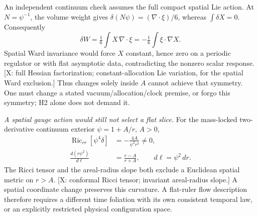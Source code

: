 An independent continuum check assumes the full compact spatial Lie
action.  At $N=\psi^{-1}$, the volume weight gives
$\delta(N\psi)=(\nabla\cdot\xi)/6$, whereas $\int\delta X=0$.
Consequently
\[
 \delta W=\tfrac16\int X\,\nabla\cdot\xi
          =-\tfrac16\int\xi\cdot\nabla X .
\]
Spatial Ward invariance would force $X$ constant, hence zero on a
periodic regulator or with flat asymptotic data, contradicting the
nonzero scalar response.
[X: full Hessian factorization; constant-allocation Lie variation,
for the spatial Ward exclusion.]
Thus changes solely inside $A$ cannot achieve that symmetry.
One must change a stated vacuum/allocation/clock premise, or forgo
this symmetry; H2 alone does not demand it.

\emph{A spatial gauge action would still not select a flat slice.}
For the mass-locked two-derivative continuum exterior
$\psi=1+A/r$, $A>0$,
\[
 \begin{aligned}
 \operatorname{Ric}_{rr}[\psi^4\delta]
       &=-\frac{4A}{\psi^2r^3}\ne0,\\
 \frac{d(r\psi^2)}{d\ell}&=\frac{r-A}{r+A},
 \qquad d\ell=\psi^2\,dr .
 \end{aligned}
\]
The Ricci tensor and the areal-radius slope both exclude a
Euclidean spatial metric on $r>A$.
[X: conformal Ricci tensor; invariant areal-radius slope.]
A spatial coordinate change preserves this curvature.
A flat-ruler flow description therefore requires a different time
foliation with its own consistent temporal law, or an explicitly
restricted physical configuration space.

